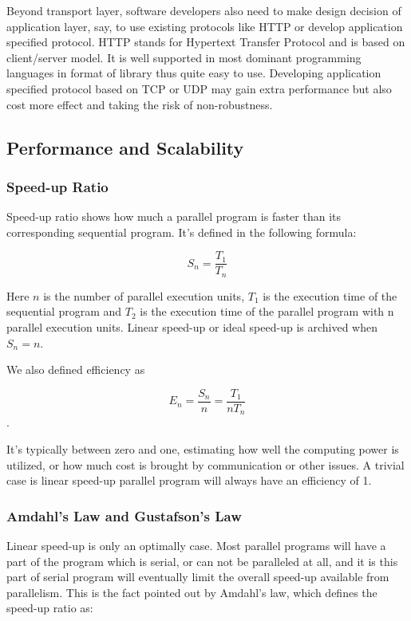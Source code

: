 \documentclass[12pt,a4paper]{report}
\begin{document}
Beyond transport layer, software developers also need to make design decision of application layer, say, to use existing protocols like HTTP or develop application specified protocol. HTTP stands for Hypertext Transfer Protocol and is based on client/server model. It is well supported in most dominant programming languages in format of library thus quite easy to use. Developing application specified protocol based on TCP or UDP may gain extra performance but also cost more effect and taking the risk of non-robustness.

\subsection{Performance and Scalability}

\subsubsection{Speed-up Ratio}

Speed-up ratio shows how much a parallel program is faster than its corresponding sequential program. It's defined in the following formula:

$$ S_n = \frac{T_1}{T_n} $$

Here $n$ is the number of parallel execution units, $T_1$ is the execution time of the sequential program and $T_2$ is the execution time of the parallel program with n parallel execution units. Linear speed-up or ideal speed-up is archived when $S_n = n$. 

We also defined efficiency as

$$ E_n = \frac{S_n}{n} = \frac{T_1}{nT_n} $$.

It's typically between zero and one, estimating how well the computing power is utilized, or how much cost is brought by communication or other issues. A trivial case is linear speed-up parallel program will always have an efficiency of 1.

\subsubsection{Amdahl's Law and Gustafson's Law}

Linear speed-up is only an optimally case. Most parallel programs will have a part of the program which is serial, or can not be paralleled at all, and it is this part of serial program will eventually limit the overall speed-up available from parallelism. This is the fact pointed out by Amdahl's law, which defines the speed-up ratio as:
\end{document}
